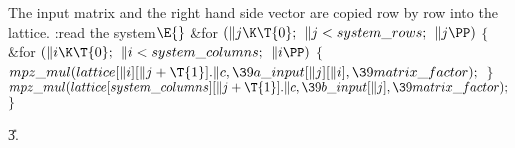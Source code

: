 The input matrix and the right hand side
vector are copied row by row into the lattice.
\Y\B\4:read the system\X${}\E{}$\6
\&{for} ${}(\|j\K\T{0};{}$ ${}\|j<\\{system\_rows};{}$ ${}\|j\PP){}$\5
${}\{{}$\1\6
\&{for} ${}(\|i\K\T{0};{}$ ${}\|i<\\{system\_columns};{}$ ${}\|i\PP){}$\5
${}\{{}$\1\6
${}\\{mpz\_mul}(\\{lattice}[\|i][\|j+\T{1}].\|c,\39\\{a\_input}[\|j][\|i],\39%
\\{matrix\_factor});{}$\6
\4${}\}{}$\2\6
${}\\{mpz\_mul}(\\{lattice}[\\{system\_columns}][\|j+\T{1}].\|c,\39\\{b%
\_input}[\|j],\39\\{matrix\_factor});{}$\6
\4${}\}{}$\2\par
\U3.\fi

